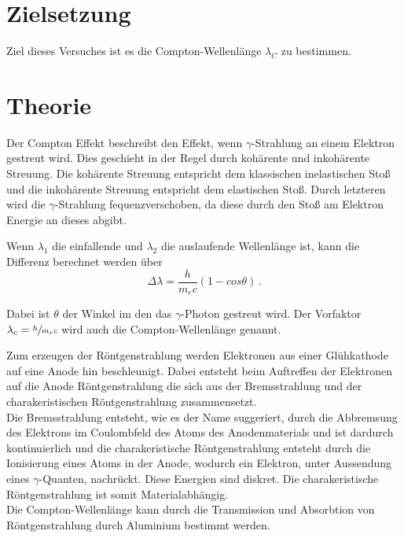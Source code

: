 \section{Zielsetzung}
Ziel dieses Versuches ist es die Compton-Wellenlänge $\lambda_C$ zu bestimmen.

\section{Theorie}
Der Compton Effekt beschreibt den Effekt, wenn $\gamma$-Strahlung an einem Elektron gestreut wird. Dies geschieht in der Regel durch kohärente und inkohärente Streuung. 
Die kohärente Streuung entspricht dem klassischen inelastischen Stoß und die inkohärente Streuung entspricht dem elastischen Stoß. Durch letzteren wird die $\gamma$-Strahlung
fequenzverschoben, da diese durch den Stoß am Elektron Energie an dieses abgibt. 

\noindent
Wenn $\lambda_1$ die einfallende und $\lambda_2$ die auslaufende Wellenlänge ist, kann die Differenz berechnet werden über
\begin{equation}
    \Delta \lambda = \frac{h}{m_ec} \left(1 - cos \theta \right) \, .
\end{equation}

\noindent
Dabei ist $\theta$ der Winkel im den das $\gamma$-Photon gestreut wird. Der Vorfaktor $\lambda_c = \sfrac{h}{m_ec}$ wird auch die Compton-Wellenlänge genannt. 

\noindent
Zum erzeugen der Röntgenstrahlung werden Elektronen aus einer Glühkathode auf eine Anode hin beschleunigt. Dabei entsteht beim Auftreffen der Elektronen auf die Anode
Röntgenstrahlung die sich aus der Bremsstrahlung und der charakeristischen Röntgenstrahlung zusammensetzt. \\
Die Bremsstrahlung entsteht, wie es der Name suggeriert, durch die Abbremsung des Elektrons im Coulombfeld des Atoms des Anodenmaterials und ist dardurch kontinuierlich 
und die charakeristische Röntgenstrahlung entsteht durch die Ionisierung eines Atoms in der Anode, wodurch ein Elektron, unter Aussendung eines $\gamma$-Quanten, nachrückt. Diese
Energien sind diskret. Die charakeristische Röntgenstrahlung ist somit Materialabhängig. \\
\noindent
Die Compton-Wellenlänge kann durch die Transmission und Absorbtion von Röntgenstrahlung durch Aluminium bestimmt werden.




